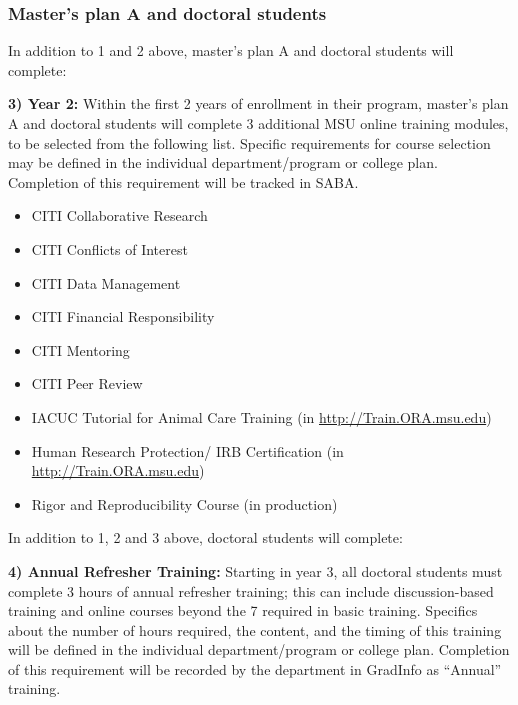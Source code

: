 \vspace{2mm}
\subsubsection{Master’s plan A and doctoral students}
\vspace{2mm}

In addition to 1 and 2 above, master’s plan A and doctoral students
will complete:

\vspace{2mm}
\noindent
\textbf{3) Year 2:}
Within the first 2 years of enrollment in their program, master’s plan
A and doctoral students will complete 3 additional MSU online training
modules, to be selected from the following list. Specific requirements
for course selection may be defined in the individual
department/program or college plan. Completion of this requirement
will be tracked in SABA.

\begin{itemize}
\item CITI Collaborative Research
\vspace{-2mm}
\item CITI Conflicts of Interest
\vspace{-2mm}
\item CITI Data Management
\vspace{-2mm}
\item CITI Financial Responsibility
\vspace{-2mm}
\item CITI Mentoring
\vspace{-2mm}
\item CITI Peer Review
\vspace{-2mm}
\item IACUC Tutorial for Animal Care Training (in \url{http://Train.ORA.msu.edu})
\vspace{-2mm}
\item Human Research Protection/ IRB Certification (in \url{http://Train.ORA.msu.edu})
\vspace{-2mm}
\item Rigor and Reproducibility Course (in production)
\end{itemize}

In addition to 1, 2 and 3 above, doctoral students will complete:

\vspace{2mm}
\noindent
\textbf{4) Annual Refresher Training:}
Starting in year 3, all doctoral students must complete 3 hours of
annual refresher training; this can include discussion-based training
and online courses beyond the 7 required in basic training. Specifics
about the number of hours required, the content, and the timing of
this training will be defined in the individual department/program or
college plan. Completion of this requirement will be recorded by the
department in GradInfo as “Annual” training.


